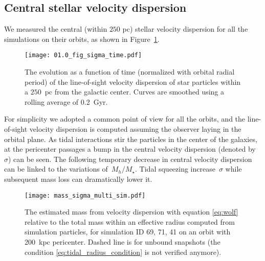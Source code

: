 \subsection{Central stellar velocity dispersion}
We measured the central (within $250$ pc) stellar velocity dispersion for all the simulations on their orbits, as shown in Figure~\ref{fig:sigma}.
\begin{figure}[ht]
\centering
\texttt{[image: 01.0\_fig\_sigma\_time.pdf]}
\caption{The evolution as a function of time (normalized with orbital radial period) of the
line-of-sight velocity dispersion of star particles within a $250$~pc from the galactic center.
Curves are smoothed using a rolling average of 0.2~Gyr.
}
\label{fig:sigma}
\end{figure}
For simplicity we adopted a common point of view for all the orbits, and the line-of-sight velocity dispersion is computed assuming the observer laying in the orbital plane.
As tidal interactions stir the particles in the center of the galaxies, at the pericenter passages a bump in the central velocity dispersion (denoted by~$\sigma$) can be seen.
The following temporary decrease in central velocity dispersion can be linked to the variations of~$M_h/M_\star$.
Tidal squeezing increase~$\sigma$ while subsequent mass loss can dramatically lower it.

\begin{figure}[ht]
\centering
\texttt{[image: mass\_sigma\_multi\_sim.pdf]}
\caption{The estimated mass from velocity dispersion with equation \eqref{eq:wolf} relative to the total mass within an effective radius computed from simulation particles,
for simulation ID 69, 71, 41 on an orbit with 200~kpc pericenter.
Dashed line is for unbound snapshots (the condition \eqref{eq:tidal_radius_condition} is not verified anymore).
}
\label{fig:wolf}
\end{figure}

